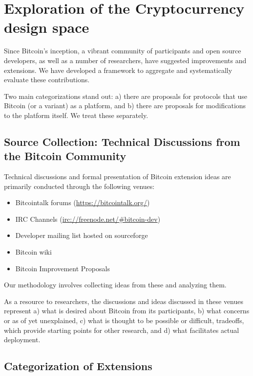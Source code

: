\section{ Exploration of the Cryptocurrency design space }

Since Bitcoin's inception, a vibrant community of participants and open source developers, as well as a number of researchers, have suggested improvements and extensions. We have developed a framework to aggregate and systematically evaluate these contributions. 

Two main categorizations stand out: a) there are proposals for protocols that use Bitcoin (or a variant) as a platform, and b) there are proposals for modifications to the platform itself. We treat these separately.

\subsection{ Source Collection: Technical Discussions from the Bitcoin Community}
Technical discussions and formal presentation of Bitcoin extension ideas are primarily conducted through the following venues:
\begin{itemize}
\item Bitcointalk forums (\url{https://bitcointalk.org/})
\item IRC Channels (\url{irc://freenode.net/#bitcoin-dev})
\item Developer mailing list hosted on sourceforge
\item Bitcoin wiki
\item Bitcoin Improvement Proposals
\end{itemize}
Our methodology involves collecting ideas from these and analyzing them.

As a resource to researchers, the discussions and ideas discussed in these venues represent a) what is desired about Bitcoin from its participants, b) what concerns or as of yet unexplained, c) what is thought to be possible or difficult, tradeoffs, which provide starting points for other research, and d) what facilitates actual deployment.

\subsection{Categorization of Extensions}

